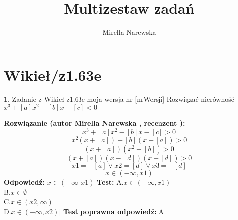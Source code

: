 \documentclass[12pt, a4paper]{article}
\title{Multizestaw zadań}
\author{Mirella Narewska}
\date{}
\theoremstyle{definition} %
\newtheorem{zad}{}
\newcommand{\kategoria}[1]{\section{#1}} %
\newcommand{\zadStart}[1]{\begin{zad}#1\newline} %
\newcommand{\zadStop}{\end{zad}}   %
\newcommand{\rozwStart}[2]{\noindent \textbf{Rozwiązanie (autor #1 , recenzent #2): }\newline} %
\newcommand{\rozwStop}{\newline}                                            %
\newcommand{\odpStart}{\noindent \textbf{Odpowiedź:}\newline}    %
\newcommand{\odpStop}{\newline}                                             %
\newcommand{\testStart}{\noindent \textbf{Test:}\newline} %
\newcommand{\testStop}{\newline} %
\newcommand{\kluczStart}{\noindent \textbf{Test poprawna odpowiedź:}\newline} %
\newcommand{\kluczStop}{\newline} %
\begin{document}
\maketitle


\kategoria{Wikieł/z1.63e}
\zadStart{Zadanie z Wikieł z1.63e moja wersja nr [nrWersji]}
Rozwiązać nierówność $x^3+[a]x^2-[b]x-[c]<0$
\zadStop
\rozwStart{Mirella Narewska}{}
$$x^3+[a]x^2-[b]x-[c]>0$$
$$x^2(x+[a])-[b](x+[a])>0$$
$$(x+[a])(x^2-[b])>0$$
$$(x+[a])(x-[d])(x+[d])>0$$
$$x1=-[a] \vee x2=[d] \vee x3=-[d]$$
$$x \in (-\infty,x1)$$
\rozwStop
\odpStart
$x \in (-\infty,x1)$
\odpStop
\testStart
A.$x \in (-\infty,x1)$
\\
B.$x \in \emptyset$
\\
C.$x \in (x2,\infty)$
\\
D.$x \in (-\infty,x2)]$
\testStop
\kluczStart
A
\kluczStop
\end{document}
